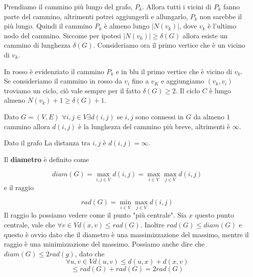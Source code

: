 \documentclass[12pt]{report}
\begin{document}
\begin{dimo}
    Prendiamo il cammino più lungo del grafo, $P_k$. Allora tutti i vicini di $P_k$ fanno parte del cammino, altrimenti potrei aggiungerli e allungarlo, $P_k$ non sarebbe il più lungo. Quindi il cammino $P_k$ è almeno lungo $|N(v_k)|$, dove $v_k$ è l'ultimo nodo del cammino. Siccome per ipotesi $|N(v_k)| \geq \delta(G)$ allora esiste un cammino di lunghezza  $\delta(G)$.
    Consideriamo ora il primo vertice che è un vicino di $v_k$.

In rosso è evidenziato il cammino $P_k$ e in blu il primo vertice che è vicino di $v_k$. Se consideriamo il cammino in rosso da $v_i$ fino a $v_K$ e aggiungiamo $(v_k,v_i)$ troviamo un ciclo, ciò vale sempre per il fatto $\delta(G) \geq 2$. Il ciclo $C$ è lungo almeno $N(v_k) + 1 \geq \delta(G) + 1$.
    
\end{dimo}

\noindent
Dato $G = (V,E)$ $\forall i,j \in V \exists d(i,j)$ se $i,j$ sono connessi in $G$ da almeno $1$ cammino allora $d(i,j)$ è la lunghezza del cammino più breve, altrimenti è $\infty$. 

\begin{exmp}
Dato il grafo
 La distanza tra $i,j$ è $d(i,j) = \infty$.
\end{exmp}

\noindent
Il \textbf{diametro} è definito come

$$diam(G) = \max_{i,j \in V} d(i,j) =  \max_{i \in V}  \max_{j \in V} d(i,j) $$
e il raggio 

$$rad(G) = \min_{i\in V} \max_{j \in V} d(i,j)$$
Il raggio lo possiamo vedere come il punto "più centrale". Sia $x$ questo punto centrale, vale che $\forall v \in V d(x,v) \leq rad(G)$. Inoltre  $rad(G) \leq diam(G)$ e questo è ovvio dato che il diametro è una massimizzazione del massimo, mentre il raggio è una minimizzazione del massimo.
Possiamo anche dire che $diam(G) \leq 2 rad(g)$, dato che 
$$\forall u,v \in V d(u,v) \leq d(u,x) + d(x,v)$$
$$\leq rad(G) + rad(G) = 2 rad(G)$$
\end{document}
